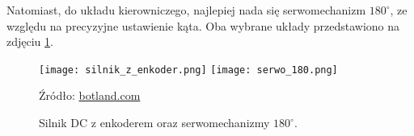             Natomiast, do układu kierowniczego, najlepiej nada się serwomechanizm $180^\circ$, ze względu na precyzyjne ustawienie kąta. Oba wybrane układy przedstawiono na zdjęciu \ref{fig:engines}.
            \begin{figure}[!ht]
                \centering
                \texttt{[image: silnik\_z\_enkoder.png]}
                \texttt{[image: serwo\_180.png]}

                \caption{Silnik DC z enkoderem oraz serwomechanizmy $180^\circ$.}
                \footnotesize{Źródło: \href{https://botland.com.pl/}{botland.com}}
                \label{fig:engines}
            \end{figure}

